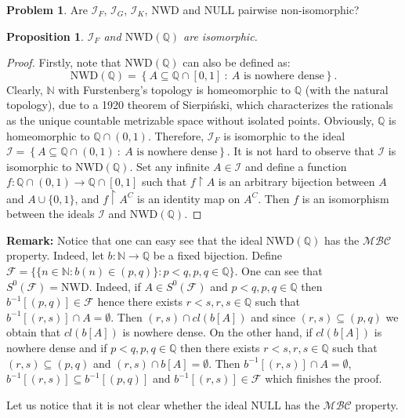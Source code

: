 \documentclass{amsart}
\newtheorem{prop}{Proposition}
\theoremstyle{definition}
\newtheorem{problem}{Problem}
\theoremstyle{definition}
\newcommand{\N}{{\mathbb N}}
\newcommand{\Q}{{\mathbb Q}}
\newcommand{\I}{\mathcal I}
\newcommand{\MB}{S^0}  %
\begin{document}
\begin{problem}
Are $\I_F$, $\I_G$, $\I_K$, $\textrm{NWD}$ and $\textrm{NULL}$ pairwise non-isomorphic?
\end{problem}


\begin{prop}
$\I_F$ and $\textrm{NWD}(\Q)$ are isomorphic.
\end{prop}
\begin{proof}
Firstly, note that $\textrm{NWD}(\Q)$ can also be defined as:
$$\textrm{NWD}(\Q)=\left\{A\subseteq\mathbb{Q}\cap [0,1]\ :\ A \textrm{ is nowhere dense}\right\}.$$
Clearly, $\N$ with Furstenberg's topology is homeomorphic to $\Q$ (with the natural topology), due to a 1920 theorem of Sierpi\'nski, which characterizes the rationals as the unique countable metrizable space without isolated points. Obviously, $\Q$ is homeomorphic to $\Q\cap (0,1)$. Therefore, $\I_F$ is isomorphic to the ideal $\I = \left\{A\subseteq\Q\cap (0,1)\ :\ A \textrm{ is nowhere dense}\right\}$. It is not hard to observe that $\I$ is isomorphic to $\textrm{NWD}(\Q)$. Set any infinite $A\in\I$ and define a function $f : \Q\cap (0,1) \to \Q\cap [0,1]$ such that $f\upharpoonright A$ is an arbitrary bijection between $A$ and $A\cup\{0,1\}$, and $f\upharpoonright A^C$ is an identity map on $A^C$.
Then $f$ is an isomorphism between the ideals $\I$ and $\textrm{NWD}(\Q)$.
\end{proof}

\textbf{Remark:} Notice that one can easy see that the ideal $\textrm{NWD}(\Q)$ has the 
$\mathcal{MBC}$ property. Indeed, let $b\colon \N \to \Q$
be a fixed bijection. Define
$\mathcal{F} = \lbrace \lbrace n\in\N\colon b(n) \in (p, q)\rbrace\colon p < q, p, q \in \Q\rbrace$.
One can see that $\MB(\mathcal{F}) = \mathrm{NWD}$. Indeed, if $A\in \MB(\mathcal{F})$
and $p < q, p, q \in \Q$ then $b^{-1}[(p, q)] \in \mathcal{F}$ hence there
exists $r < s, r, s \in \Q$ such that $b^{-1}[(r, s)] \cap A = \emptyset$.
Then $(r, s) \cap \mathit{cl}(b[A])$ and since $(r, s) \subseteq (p, q)$ we obtain that 
$\mathit{cl}(b[A])$ is nowhere dense. On the other hand, if $\mathit{cl}(b[A])$ is nowhere dense and if
$p < q, p, q \in \Q$ then there exists $r < s, r, s \in \Q$
such that $(r, s) \subseteq (p, q)$ and 
$(r, s) \cap b[A] = \emptyset$. Then $b^{-1}[(r, s)] \cap A = \emptyset$,
$b^{-1}[(r, s)] \subseteq b^{-1}[(p, q)]$ and
$b^{-1}[(r, s)] \in \mathcal{F}$ which finishes the proof.

Let us notice that it is not clear whether the ideal $\textrm{NULL}$ has the $\mathcal{MBC}$ property.
\end{document}
